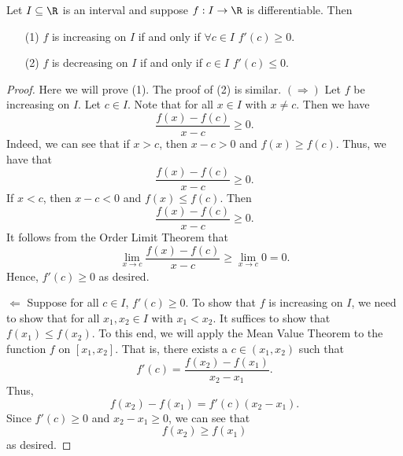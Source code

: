 \begin{theorem}
   Let \( I \subseteq \R   \) is an interval and suppose \( f : I \to \R  \) is differentiable. Then 
   \begin{enumerate}
       \item[(1)] \( f  \) is increasing on \( I  \) if and only if \( \forall c \in I  \) \( f'(c) \geq 0  \).
        \item[(2)] \( f  \) is decreasing on \( I  \) if and only if \( c \in I   \) \( f'(c) \leq 0  \).
   \end{enumerate}
\end{theorem}
\begin{proof}
Here we will prove (1). The proof of (2) is similar. 
\( (\Longrightarrow) \) Let \( f  \) be increasing on \( I  \). Let \( c \in I  \). Note that for all \( x \in I  \) with \( x \neq c  \). Then we have 
\[  \frac{ f(x) - f(c) }{ x - c  }  \geq 0.  \]
Indeed, we can see that if \( x > c  \), then \( x - c > 0  \) and \( f(x) \geq f(c) \). Thus, we have that 
\[  \frac{ f(x) - f(c) }{ x - c  }  \geq 0.  \]
If \( x < c  \), then \( x - c < 0  \) and \( f(x) \leq f(c) \). Then 
\[  \frac{ f(x) - f(c) }{ x -c  }  \geq 0. \]
It follows from the Order Limit Theorem that 
\[  \lim_{ x \to c  }  \frac{ f(x) - f(c) }{  x-  c  }  \geq \lim_{ x \to c  }  0  = 0. \]
Hence, \( f'(c) \geq 0 \) as desired.

\( \Longleftarrow \) Suppose for all \( c \in I  \), \( f'(c) \geq 0  \). To show that \( f  \) is increasing on \( I  \), we need to show that for all \( {x}_{1}, {x}_{2} \in I   \) with \( {x}_{1} < {x}_{2} \). It suffices to show that \( f({x}_{1}) \leq f({x}_{2}) \). To this end, we will apply the Mean Value Theorem to the function \( f  \) on \( [{x}_{1}, {x}_{2}] \). That is, there exists a \( c \in ({x}_{1}, {x}_{2}) \) such that 
\[  f'(c) = \frac{ f({x}_{2})- f({x}_{1}) }{  {x}_{2} - {x}_{1} }. \]
Thus, 
\[  f({x}_{2}) - f({x}_{1}) = f'(c) ({x}_{2} - {x}_{1}). \]
Since \( f'(c) \geq 0  \) and \( {x}_{2} - {x}_{1} \geq 0  \), we can see that 
\[  f({x}_{2}) \geq f({x}_{1}) \]
as desired.
\end{proof}


